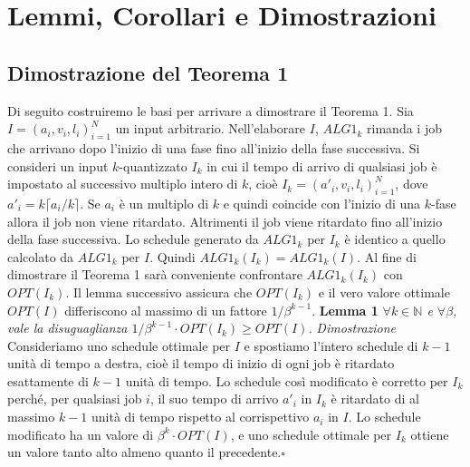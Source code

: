 \documentclass[twoside,openany,titlepage,fleqn,
	headinclude,12pt,a4paper,BCOR5mm,footinclude]{scrbook}
\newcommand*{\N}{\mathbb{N}}
\begin{document}
\chapter{Lemmi, Corollari e Dimostrazioni}
\section{Dimostrazione del Teorema 1}
Di seguito costruiremo le basi per arrivare a dimostrare il Teorema 1. Sia $I=(a_{i}, v_{i}, l_{i})_{i = 1}^{N}$
un input arbitrario. Nell'elaborare $I$, $ALG1_{k}$ rimanda i job che arrivano dopo l'inizio di una fase fino all'inizio della fase successiva. Si consideri un input $k$-quantizzato $I_{k}$ in cui il tempo di arrivo di qualsiasi job è impostato al successivo multiplo intero di $k$, cioè $I_{k} = (a'_{i}, v_{i},l_{i})_{i = 1}^{N}$, dove $a'_{i} =k\lceil a_{i}/k\rceil$. Se $a_{i}$ è un multiplo di $k$ e quindi coincide con l'inizio di una $k$-fase allora il job non viene ritardato. Altrimenti il job viene ritardato fino all'inizio della fase successiva. Lo schedule generato da $ALG1_{k}$ per $I_{k}$ è identico a quello calcolato da $ALG1_{k}$ per $I$. Quindi $ALG1_{k}(I_{k}) = ALG1_{k}(I)$. Al fine di dimostrare il Teorema 1  sarà conveniente confrontare $ALG1_{k}(I_{k})$ con $OPT(I_{k})$. Il lemma successivo assicura che $OPT(I_{k})$ e il vero valore ottimale $OPT(I)$ differiscono al massimo di un fattore  $1/\beta^{k - 1}$.\newline\newline
\textbf{Lemma 1}
\textit{$\forall k \in \N$ e $\forall \beta$, vale la disuguaglianza $1/\beta^{k-1} \cdot OPT(I_{k}) \geq OPT(I)$.}\newline\newline
\textit{Dimostrazione}
Consideriamo uno schedule ottimale per $I$ e spostiamo l'intero schedule di $k - 1$ unità di tempo a destra, cioè il tempo di inizio di ogni job è ritardato esattamente di $k - 1$ unità di tempo. Lo schedule così modificato è corretto per $I_{k}$ perché, per qualsiasi job $i$, il suo tempo di arrivo $a'_{i}$ in $I_{k}$ è ritardato di al massimo $k - 1$ unità di tempo rispetto al corrispettivo $a_{i}$ in $I$. Lo schedule modificato ha un valore di $\beta^{k} \cdot OPT(I)$, e uno schedule ottimale per $I_{k}$ ottiene un valore tanto alto almeno quanto il precedente.\hfill $\square$ \vspace{5mm}
\end{document}
